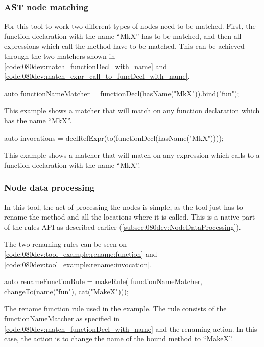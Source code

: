 \subsubsection*{AST node matching}

For this tool to work two different types of nodes need to be matched. First, the function declaration with the name ``MkX'' has to be matched, and then all expressions which call the method have to be matched. This can be achieved through the two matchers shown in \cref{code:080dev:match_functionDecl_with_name} and \cref{code:080dev:match_expr_call_to_funcDecl_with_name}.

\begin{listing}[H]
    \begin{cppcode}
auto functionNameMatcher = functionDecl(hasName("MkX")).bind("fun");
    \end{cppcode}
    \caption{This example shows a matcher that will match on any function declaration which has the name ``MkX''.}
    \label{code:080dev:match_functionDecl_with_name}
\end{listing}

\begin{listing}[H]
    \begin{cppcode}
auto invocations = declRefExpr(to(functionDecl(hasName("MkX"))));
    \end{cppcode}
    \caption{This example shows a matcher that will match on any expression which calls to a function declaration with the name ``MkX''.}
    \label{code:080dev:match_expr_call_to_funcDecl_with_name}
\end{listing}

\subsubsection*{Node data processing}

In this tool, the act of processing the nodes is simple, as the tool just has to rename the method and all the locations where it is called. This is a native part of the rules API as described earlier (\cref{subsec:080dev:NodeDataProcessing}). 

The two renaming rules can be seen on \cref{code:080dev:tool_example:rename:function} and \cref{code:080dev:tool_example:rename:invocation}.

\begin{listing}[H]
    \begin{cppcode}
auto renameFunctionRule = makeRule(
        functionNameMatcher,
        changeTo(name("fun"), cat("MakeX")));
    \end{cppcode}
    \caption{The rename function rule used in the example. The rule consists of the functionNameMatcher as specified in \cref{code:080dev:match_functionDecl_with_name} and the renaming action. In this case, the action is to change the name of the bound method to ``MakeX''.}
    \label{code:080dev:tool_example:rename:function}
\end{listing}

